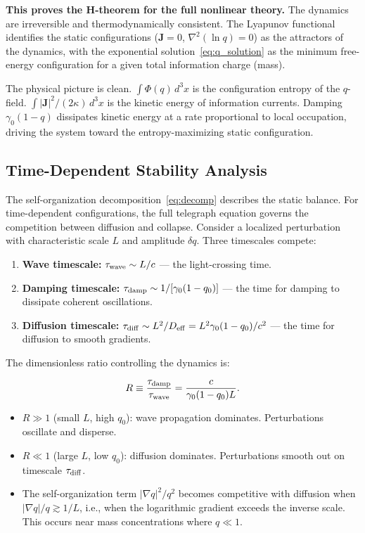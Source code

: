 \documentclass[aps,prd,twocolumn,showpacs,superscriptaddress,preprintnumbers]{revtex4-2}
\begin{document}
\textbf{This proves the H-theorem for the full nonlinear theory.}
The dynamics are irreversible and thermodynamically consistent.
The Lyapunov functional identifies the static configurations ($\mathbf{J}=0$, $\nabla^2(\ln q)=0$) as the attractors of the dynamics, with the exponential solution~\eqref{eq:q_solution} as the minimum free-energy configuration for a given total information charge (mass).

The physical picture is clean.
$\int\Phi(q)\,d^3x$ is the configuration entropy of the $q$-field.
$\int|\mathbf{J}|^2/(2\kappa)\,d^3x$ is the kinetic energy of information currents.
Damping $\gamma_0(1-q)$ dissipates kinetic energy at a rate proportional to local occupation, driving the system toward the entropy-maximizing static configuration.

\subsection{Time-Dependent Stability Analysis}
\label{sec:stability}

The self-organization decomposition~\eqref{eq:decomp} describes the static balance.
For time-dependent configurations, the full telegraph equation governs the competition between diffusion and collapse.
Consider a localized perturbation with characteristic scale $L$ and amplitude $\delta q$.
Three timescales compete:

\begin{enumerate}
    \item \textbf{Wave timescale:} $\tau_{\rm wave} \sim L/c$ --- the light-crossing time.
    \item \textbf{Damping timescale:} $\tau_{\rm damp} \sim 1/[\gamma_0(1-q_0)]$ --- the time for damping to dissipate coherent oscillations.
    \item \textbf{Diffusion timescale:} $\tau_{\rm diff} \sim L^2/D_{\rm eff} = L^2\gamma_0(1-q_0)/c^2$ --- the time for diffusion to smooth gradients.
\end{enumerate}

The dimensionless ratio controlling the dynamics is:

\begin{equation}
R \equiv \frac{\tau_{\rm damp}}{\tau_{\rm wave}} = \frac{c}{\gamma_0(1-q_0)L}.
\label{eq:stability_R}
\end{equation}

\begin{itemize}
    \item $R\gg1$ (small $L$, high $q_0$): wave propagation dominates. Perturbations oscillate and disperse.
    \item $R\ll1$ (large $L$, low $q_0$): diffusion dominates. Perturbations smooth out on timescale $\tau_{\rm diff}$.
    \item The self-organization term $|\nabla q|^2/q^2$ becomes competitive with diffusion when $|\nabla q|/q \gtrsim 1/L$, i.e., when the logarithmic gradient exceeds the inverse scale. This occurs near mass concentrations where $q\ll1$.
\end{itemize}
\end{document}
